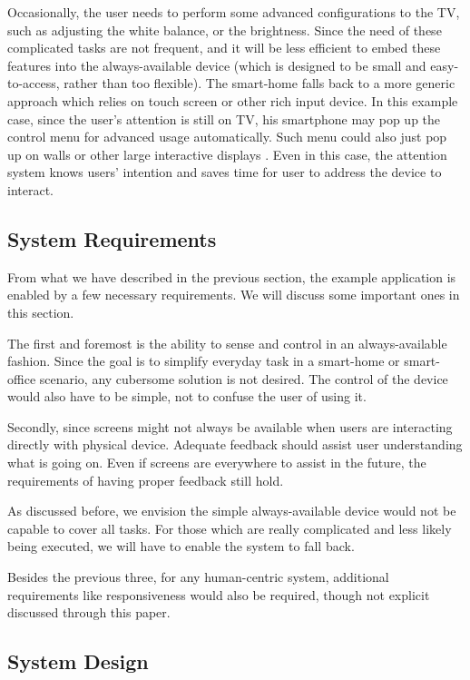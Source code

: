 Occasionally, the user needs to perform some advanced configurations to the TV, such as adjusting the white balance, or the brightness. Since the need of these complicated tasks are not frequent, and it will be less efficient to embed these features into the always-available device (which is designed to be small and easy-to-access, rather than too flexible). The smart-home falls back to a more generic approach which relies on touch screen or other rich input device. In this example case, since the user's attention is still on TV, his smartphone may pop up the control menu for advanced usage automatically. Such menu could also just pop up on walls or other large interactive displays \cite{unPad:eWallpaper, MSVision}. Even in this case, the attention system knows users' intention and saves time for user to address the device to interact.

\subsection{System Requirements}
\label{sec:system-requirements}

From what we have described in the previous section, the example application is enabled by a few necessary requirements. We will discuss some important ones in this section.

The first and foremost is the ability to sense and control in an always-available fashion. Since the goal is to simplify everyday task in a smart-home or smart-office scenario, any cubersome solution is not desired. The control of the device would also have to be simple, not to confuse the user of using it. 

Secondly, since screens might not always be available when users are interacting directly with physical device. Adequate feedback should assist user understanding what is going on. Even if screens are everywhere to assist in the future, the requirements of having proper feedback still hold.

As discussed before, we envision the simple always-available device would not be capable to cover all tasks. For those which are really complicated and less likely being executed, we will have to enable the system to fall back.

Besides the previous three, for any human-centric system, additional requirements like responsiveness would also be required, though not explicit discussed through this paper.

\subsection{System Design}
\label{sec:system-design}

